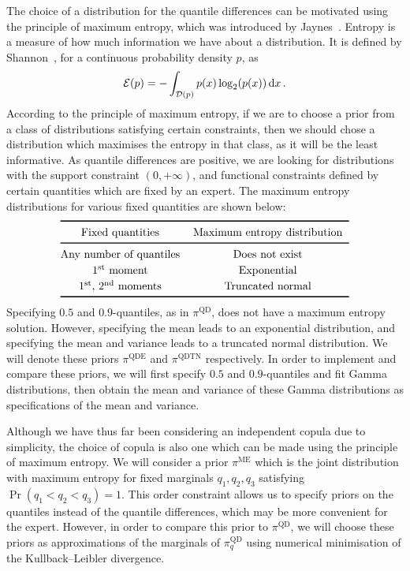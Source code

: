 \documentclass{article}
\newcommand{\dd}{{\rm d}}
\newcommand{\st} {\textsuperscript{st}}
\newcommand{\nd} {\textsuperscript{nd}}
\begin{document}
%
The choice of a distribution for the quantile differences can be motivated
using the principle of maximum entropy,
which was introduced by Jaynes~\cite{jaynes1957}.
Entropy is a measure of how much information we have about a distribution.
It is defined by Shannon~\cite{shannon1948}, for a continuous probability density $p$, as
%
\begin{align*}
	{\cal E}(p) = -\int_{{\cal D}(p)} p(x) \log_2(p(x)) \, \dd x \,.
\end{align*}
%
According to the principle of maximum entropy,
if we are to choose a prior from a class of distributions satisfying
certain constraints,
then we should chose a distribution which maximises the entropy in that class,
as it will be the least informative.
As quantile differences are positive,
we are looking for distributions with the support constraint $(0, +\infty)$,
and functional constraints defined by certain quantities which are fixed by an expert.
The maximum entropy distributions for various fixed quantities are shown below:
%
\begin{align*}
	\centering
	\renewcommand{\arraystretch}{1.2}
	\begin{tabular}{@{}ccc@{}}
		\toprule[0.1em]
		Fixed quantities &Maximum entropy distribution\\
		\midrule[0.1em]
		Any number of quantiles &Does not exist \\
		1\st\ moment &Exponential \\
		1\st, 2\nd\ moments &Truncated normal \\
		\bottomrule[0.1em]
	\end{tabular}
\end{align*}
%
Specifying $0.5$ and $0.9$-quantiles, as in $\pi^{\text{QD}}$,
does not have a maximum entropy solution.
However, specifying the mean leads to an exponential distribution,
and specifying the mean and variance leads to a truncated normal distribution.
We will denote these priors $\pi^{\text{QDE}}$ and $\pi^{\text{QDTN}}$ respectively.
In order to implement and compare these priors,
we will first specify $0.5$ and $0.9$-quantiles and fit Gamma distributions,
then obtain the mean and variance of these Gamma distributions
as specifications of the mean and variance.
%

%
Although we have thus far been considering an independent copula due to simplicity,
the choice of copula is also one which can be made using
the principle of maximum entropy.
We will consider a prior $\pi^{\text{ME}}$ which is the joint distribution with
maximum entropy for fixed marginals $q_1, q_2, q_3$
satisfying $\Pr(q_1 < q_2 < q_3) = 1$.
This order constraint allows us to specify priors on the quantiles instead
of the quantile differences, which may be more convenient for the expert.
However, in order to compare this prior to $\pi^{\text{QD}}$, we will 
choose these priors as approximations of the marginals of $\pi^{\text{QD}}_q$
using numerical minimisation of the Kullback–Leibler divergence.
%
\end{document}
